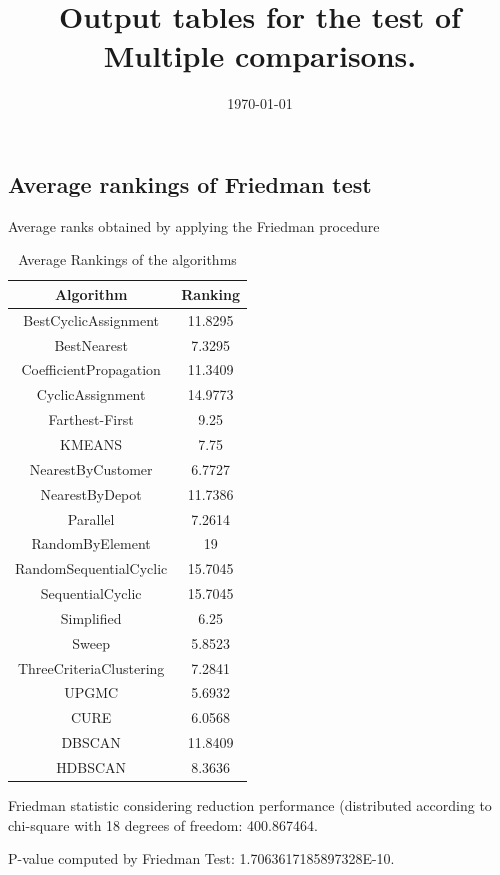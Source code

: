 \documentclass[a4paper,10pt]{article}
\title{Output tables for the test of Multiple comparisons.}
\author{}
\date{\today}
\begin{document}
\begin{landscape}
\pagestyle{empty}
\maketitle
\thispagestyle{empty}
\section{Average rankings of Friedman test}



Average ranks obtained by applying the Friedman procedure

\begin{table}[!htp]
\centering
\begin{tabular}{|c|c|}\hline
Algorithm&Ranking\\\hline
BestCyclicAssignment & 11.8295\\
BestNearest & 7.3295\\
CoefficientPropagation & 11.3409\\
CyclicAssignment & 14.9773\\
Farthest-First & 9.25\\
KMEANS & 7.75\\
NearestByCustomer & 6.7727\\
NearestByDepot & 11.7386\\
Parallel & 7.2614\\
RandomByElement & 19\\
RandomSequentialCyclic & 15.7045\\
SequentialCyclic & 15.7045\\
Simplified & 6.25\\
Sweep & 5.8523\\
ThreeCriteriaClustering & 7.2841\\
UPGMC & 5.6932\\
CURE & 6.0568\\
DBSCAN & 11.8409\\
HDBSCAN & 8.3636\\
\hline
\end{tabular}
\caption{Average Rankings of the algorithms}
\end{table}

Friedman statistic considering reduction performance (distributed according to chi-square with 18 degrees of freedom: 400.867464.

P-value computed by Friedman Test: 1.7063617185897328E-10.\newline


\end{landscape}
\end{document}
